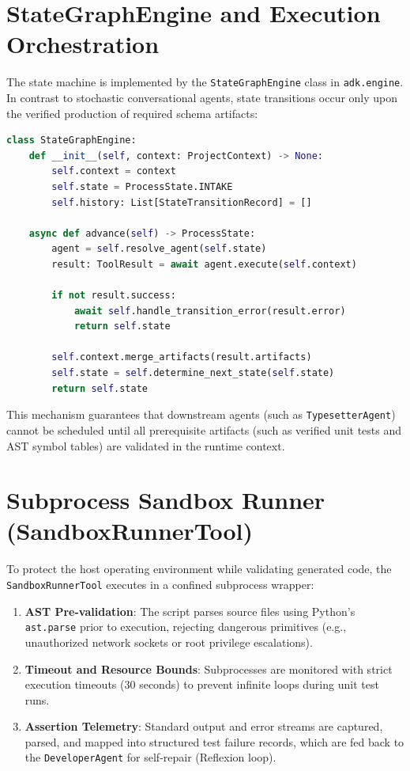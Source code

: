 \section{StateGraphEngine and Execution Orchestration}
\label{sec:stategraph_impl}

The state machine is implemented by the \texttt{StateGraphEngine} class in \texttt{adk.engine}. In contrast to stochastic conversational agents, state transitions occur only upon the verified production of required schema artifacts:

\begin{lstlisting}[language=Python, caption={Core state advancement logic within the StateGraphEngine}, label={lst:stategraph_py}]
class StateGraphEngine:
    def __init__(self, context: ProjectContext) -> None:
        self.context = context
        self.state = ProcessState.INTAKE
        self.history: List[StateTransitionRecord] = []

    async def advance(self) -> ProcessState:
        agent = self.resolve_agent(self.state)
        result: ToolResult = await agent.execute(self.context)
        
        if not result.success:
            await self.handle_transition_error(result.error)
            return self.state
            
        self.context.merge_artifacts(result.artifacts)
        self.state = self.determine_next_state(self.state)
        return self.state
\end{lstlisting}

This mechanism guarantees that downstream agents (such as \texttt{TypesetterAgent}) cannot be scheduled until all prerequisite artifacts (such as verified unit tests and AST symbol tables) are validated in the runtime context.

\section{Subprocess Sandbox Runner (SandboxRunnerTool)}
\label{sec:sandbox_impl}

To protect the host operating environment while validating generated code, the \texttt{SandboxRunnerTool} executes in a confined subprocess wrapper:
\begin{enumerate}
    \item \textbf{AST Pre-validation}: The script parses source files using Python's \texttt{ast.parse} prior to execution, rejecting dangerous primitives (e.g., unauthorized network sockets or root privilege escalations).
    \item \textbf{Timeout and Resource Bounds}: Subprocesses are monitored with strict execution timeouts ($30$ seconds) to prevent infinite loops during unit test runs.
    \item \textbf{Assertion Telemetry}: Standard output and error streams are captured, parsed, and mapped into structured test failure records, which are fed back to the \texttt{DeveloperAgent} for self-repair (Reflexion loop).
\end{enumerate}

